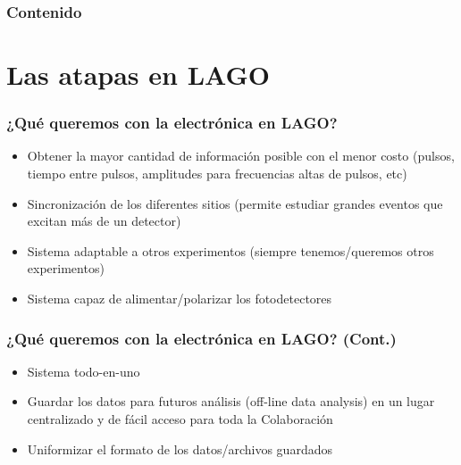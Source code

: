 \documentclass{beamer}
\begin{document}
\begin{frame}
  \frametitle{Contenido}
  \tableofcontents
\end{frame}
%
%

\section{Las atapas en LAGO}
\begin{frame}
  \begin{center}
    \Huge{\color{blue}{Las etapas (electrónicas) en LAGO}}
  \end{center}
\end{frame}

\begin{frame}
	\frametitle{¿Qué queremos con la electrónica en LAGO?}
		\begin{block}{}
    	\begin{itemize}
      	\item Obtener la mayor cantidad de información
							posible con el menor costo (pulsos, tiempo
							entre pulsos, amplitudes para frecuencias
							altas de pulsos, etc) 
      	\item Sincronización de los diferentes sitios (permite estudiar grandes
							eventos que excitan más de un detector)
      	\item Sistema adaptable a otros experimentos (siempre tenemos/queremos
							otros experimentos)
      	\item Sistema capaz de alimentar/polarizar los fotodetectores

    	\end{itemize}
		\end{block}
\end{frame} 

\begin{frame}
	\frametitle{¿Qué queremos con la electrónica en LAGO? (Cont.)}
		\begin{block}{}
    	\begin{itemize}
      	\item Sistema todo-en-uno
        \item Guardar los datos para futuros análisis (off-line data analysis)
              en un lugar centralizado y de fácil acceso para toda la
							Colaboración
        \item Uniformizar el formato de los datos/archivos guardados
    	\end{itemize}
		\end{block}
\end{frame} 
\end{document}
